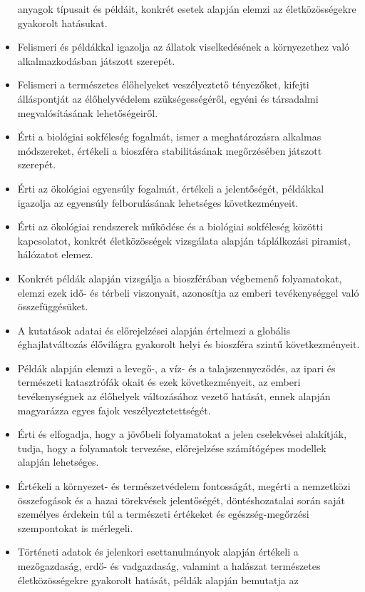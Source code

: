 \begin{itemize}
  anyagok típusait és példáit, konkrét esetek alapján elemzi az
  életközösségekre gyakorolt hatásukat.
\item
  Felismeri és példákkal igazolja az állatok viselkedésének a
  környezethez való alkalmazkodásban játszott szerepét.
\item
  Felismeri a természetes élőhelyeket veszélyeztető tényezőket, kifejti
  álláspontját az élőhelyvédelem szükségességéről, egyéni és társadalmi
  megvalósításának lehetőségeiről.
\item
  Érti a biológiai sokféleség fogalmát, ismer a meghatározásra alkalmas
  módszereket, értékeli a bioszféra stabilitásának megőrzésében játszott
  szerepét.
\item
  Érti az ökológiai egyensúly fogalmát, értékeli a jelentőségét,
  példákkal igazolja az egyensúly felborulásának lehetséges
  következményeit.
\item
  Érti az ökológiai rendszerek működése és a biológiai sokféleség
  közötti kapcsolatot, konkrét életközösségek vizsgálata alapján
  táplálkozási piramist, hálózatot elemez.
\item
  Konkrét példák alapján vizsgálja a bioszférában végbemenő
  folyamatokat, elemzi ezek idő- és térbeli viszonyait, azonosítja az
  emberi tevékenységgel való összefüggésüket.
\item
  A kutatások adatai és előrejelzései alapján értelmezi a globális
  éghajlatváltozás élővilágra gyakorolt helyi és bioszféra szintű
  következményeit.
\item
  Példák alapján elemzi a levegő-, a víz- és a talajszennyeződés, az
  ipari és természeti katasztrófák okait és ezek következményeit, az
  emberi tevékenységnek az élőhelyek változásához vezető hatását, ennek
  alapján magyarázza egyes fajok veszélyeztetettségét.
\item
  Érti és elfogadja, hogy a jövőbeli folyamatokat a jelen cselekvései
  alakítják, tudja, hogy a folyamatok tervezése, előrejelzése
  számítógépes modellek alapján lehetséges.
\item
  Értékeli a környezet- és természetvédelem fontosságát, megérti a
  nemzetközi összefogások és a hazai törekvések jelentőségét,
  döntéshozatalai során saját személyes érdekein túl a természeti
  értékeket és egészség-megőrzési szempontokat is mérlegeli.
\item
  Történeti adatok és jelenkori esettanulmányok alapján értékeli a
  mezőgazdaság, erdő- és vadgazdaság, valamint a halászat természetes
  életközösségekre gyakorolt hatását, példák alapján bemutatja az

\end{itemize}
